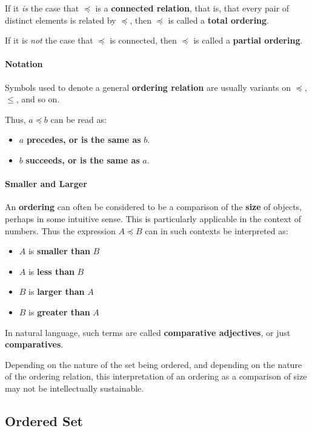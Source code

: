 If it \textit{is} the case that $\preceq$ is a \textbf{connected
  relation}, that is, that every pair of distinct elements is related
by $\preceq$, then $\preceq$ is called a \textbf{total ordering}.

If it is \textit{not} the case that $\preceq$ is connected, then
$\preceq$ is called a \textbf{partial ordering}.


\paragraph{Notation}

Symbols used to denote a general \textbf{ordering relation} are
usually variants on $\preceq$, $\leq$, and so on.

Thus, $a \preceq b$ can be read as:
\begin{itemize}
\item $a$ \textbf{precedes, or is the same as} $b$.
\item $b$ \textbf{succeeds, or is the same as} $a$.
\end{itemize}

\paragraph{Smaller and Larger}

An \textbf{ordering} can often be considered to be a comparison of the
\textbf{size} of objects, perhaps in some intuitive sense. This is
particularly applicable in the context of numbers. Thus the expression
$A \preceq B$ can in such contexts be interpreted as:
\begin{itemize}
\item $A$ is \textbf{smaller than} $B$
\item $A$ is \textbf{less than} $B$
\item $B$ is \textbf{larger than} $A$
\item $B$ is \textbf{greater than} $A$
\end{itemize}

In natural language, such terms are called \textbf{comparative
  adjectives}, or just \textbf{comparatives}.

Depending on the nature of the set being ordered, and depending on the
nature of the ordering relation, this interpretation of an ordering as
a comparison of size may not be intellectually sustainable.

\subsection{Ordered Set}
\label{sec:ordered-set}

